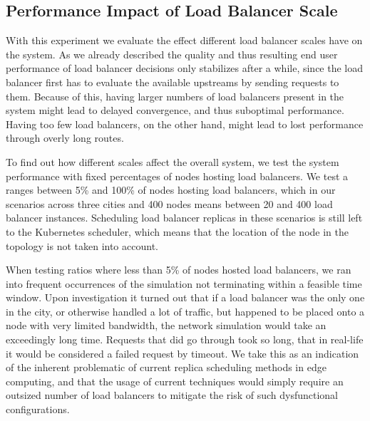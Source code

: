 \subsection{Performance Impact of Load Balancer Scale}
With this experiment we evaluate the effect different load balancer scales have on the system.
As we already described the quality and thus resulting end user performance of load balancer decisions only stabilizes after a while, since the load balancer first has to evaluate the available upstreams by sending requests to them.
Because of this, having larger numbers of load balancers present in the system might lead to delayed convergence, and thus suboptimal performance.
Having too few load balancers, on the other hand, might lead to lost performance through overly long routes.

To find out how different scales affect the overall system, we test the system performance with fixed percentages of nodes hosting load balancers.
We test a ranges between 5\% and 100\% of nodes hosting load balancers, which in our scenarios across three cities and 400 nodes means between 20 and 400 load balancer instances.
Scheduling load balancer replicas in these scenarios is still left to the Kubernetes scheduler, which means that the location of the node in the topology is not taken into account.

When testing ratios where less than 5\% of nodes hosted load balancers, we ran into frequent occurrences of the simulation not terminating within a feasible time window.
Upon investigation it turned out that if a load balancer was the only one in the city, or otherwise handled a lot of traffic, but happened to be placed onto a node with very limited bandwidth, the network simulation would take an exceedingly long time.
Requests that did go through took so long, that in real-life it would be considered a failed request by timeout.
We take this as an indication of the inherent problematic of current replica scheduling methods in edge computing, and that the usage of current techniques would simply require an outsized number of load balancers to mitigate the risk of such dysfunctional configurations.

